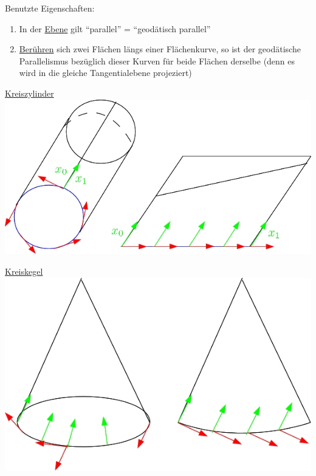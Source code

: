 \begin{bsp}
 Benutzte Eigenschaften:
 \begin{enumerate}
  \item In der \uline{Ebene} gilt "`parallel"' = "`geodätisch parallel"'
  \item \uline{Berühren} sich zwei Flächen längs einer Flächenkurve, so ist der geodätische Parallelismus bezüglich dieser Kurven für beide Flächen derselbe (denn es wird in die gleiche Tangentialebene projeziert)
 \end{enumerate}
\uline{Kreiszylinder} \includegraphics[scale=0.2]{Bilder/Bsp9} \par
\uline{Kreiskegel} \includegraphics[scale=0.2]{Bilder/Bsp10} \par

\end{bsp}
